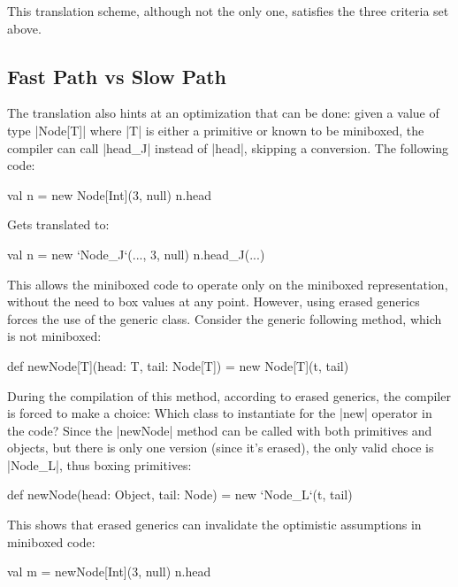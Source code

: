 This translation scheme, although not the only one, satisfies the three criteria set above.

\subsection{Fast Path vs Slow Path}

The translation also hints at an optimization that can be done: given a value of type |Node[T]| where |T| is either a primitive or known to be miniboxed, the compiler can call |head_J| instead of |head|, skipping a conversion. The following code:

\begin{lstlisting-nobreak}
 val n = new Node[Int](3, null)
 n.head
\end{lstlisting-nobreak}

Gets translated to:

\begin{lstlisting-nobreak}
 val n = new `Node_J`(..., 3, null)
 n.head_J(...)
\end{lstlisting-nobreak}

This allows the miniboxed code to operate only on the miniboxed representation, without the need to box values at any point. However, using erased generics forces the use of the generic class. Consider the generic following method, which is not miniboxed:

\begin{lstlisting-nobreak}
 def newNode[T](head: T, tail: Node[T]) =
   new Node[T](t, tail)
\end{lstlisting-nobreak}

During the compilation of this method, according to erased generics, the compiler is forced to make a choice: Which class to instantiate for the |new| operator in the code? Since the |newNode| method can be called with both primitives and objects, but there is only one version (since it's erased), the only valid choce is |Node_L|, thus boxing primitives:

\begin{lstlisting-nobreak}
 def newNode(head: Object, tail: Node) =
   new `Node_L`(t, tail)
\end{lstlisting-nobreak}

This shows that erased generics can invalidate the optimistic assumptions in miniboxed code:

\begin{lstlisting-nobreak}
 val m = newNode[Int](3, null)
 n.head
\end{lstlisting-nobreak}

